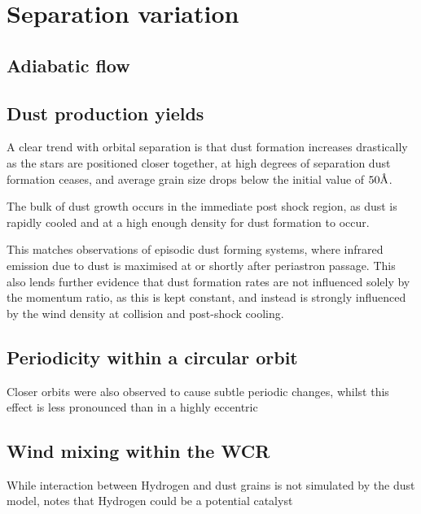 \section{Separation variation}




\subsection{Adiabatic flow}


\subsection{Dust production yields}

A clear trend with orbital separation is that dust formation increases drastically as the stars are positioned closer together, at high degrees of separation dust formation ceases, and average grain size drops below the initial value of $50 \text \AA$.

The bulk of dust growth occurs in the immediate post shock region, as dust is rapidly cooled and at a high enough density for dust formation to occur.

This matches observations of episodic dust forming systems, where infrared emission due to dust is maximised at or shortly after periastron passage. This also lends further evidence that dust formation rates are not influenced solely by the momentum ratio, as this is kept constant, and instead is strongly influenced by the wind density at collision and post-shock cooling. 

\subsection{Periodicity within a circular orbit}

Closer orbits were also observed to cause subtle periodic changes, whilst this effect is less pronounced than in a highly eccentric 



\subsection{Wind mixing within the WCR}


While interaction between Hydrogen and dust grains is not simulated by the dust model, \cite{leteuffModelDustFormation2002} notes that Hydrogen could be a potential catalyst



